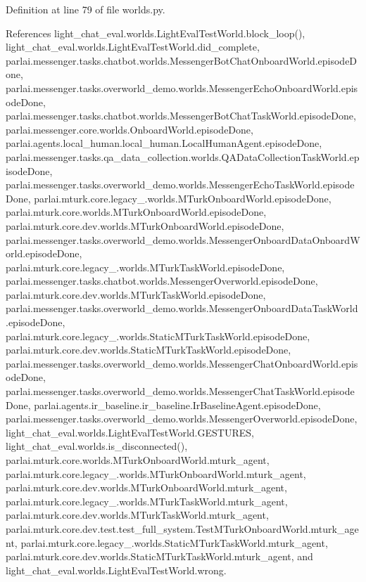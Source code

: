 Definition at line 79 of file worlds.\+py.



References light\+\_\+chat\+\_\+eval.\+worlds.\+Light\+Eval\+Test\+World.\+block\+\_\+loop(), light\+\_\+chat\+\_\+eval.\+worlds.\+Light\+Eval\+Test\+World.\+did\+\_\+complete, parlai.\+messenger.\+tasks.\+chatbot.\+worlds.\+Messenger\+Bot\+Chat\+Onboard\+World.\+episode\+Done, parlai.\+messenger.\+tasks.\+overworld\+\_\+demo.\+worlds.\+Messenger\+Echo\+Onboard\+World.\+episode\+Done, parlai.\+messenger.\+tasks.\+chatbot.\+worlds.\+Messenger\+Bot\+Chat\+Task\+World.\+episode\+Done, parlai.\+messenger.\+core.\+worlds.\+Onboard\+World.\+episode\+Done, parlai.\+agents.\+local\+\_\+human.\+local\+\_\+human.\+Local\+Human\+Agent.\+episode\+Done, parlai.\+messenger.\+tasks.\+qa\+\_\+data\+\_\+collection.\+worlds.\+Q\+A\+Data\+Collection\+Task\+World.\+episode\+Done, parlai.\+messenger.\+tasks.\+overworld\+\_\+demo.\+worlds.\+Messenger\+Echo\+Task\+World.\+episode\+Done, parlai.\+mturk.\+core.\+legacy\+\_.\+worlds.\+M\+Turk\+Onboard\+World.\+episode\+Done, parlai.\+mturk.\+core.\+worlds.\+M\+Turk\+Onboard\+World.\+episode\+Done, parlai.\+mturk.\+core.\+dev.\+worlds.\+M\+Turk\+Onboard\+World.\+episode\+Done, parlai.\+messenger.\+tasks.\+overworld\+\_\+demo.\+worlds.\+Messenger\+Onboard\+Data\+Onboard\+World.\+episode\+Done, parlai.\+mturk.\+core.\+legacy\+\_.\+worlds.\+M\+Turk\+Task\+World.\+episode\+Done, parlai.\+messenger.\+tasks.\+chatbot.\+worlds.\+Messenger\+Overworld.\+episode\+Done, parlai.\+mturk.\+core.\+dev.\+worlds.\+M\+Turk\+Task\+World.\+episode\+Done, parlai.\+messenger.\+tasks.\+overworld\+\_\+demo.\+worlds.\+Messenger\+Onboard\+Data\+Task\+World.\+episode\+Done, parlai.\+mturk.\+core.\+legacy\+\_.\+worlds.\+Static\+M\+Turk\+Task\+World.\+episode\+Done, parlai.\+mturk.\+core.\+dev.\+worlds.\+Static\+M\+Turk\+Task\+World.\+episode\+Done, parlai.\+messenger.\+tasks.\+overworld\+\_\+demo.\+worlds.\+Messenger\+Chat\+Onboard\+World.\+episode\+Done, parlai.\+messenger.\+tasks.\+overworld\+\_\+demo.\+worlds.\+Messenger\+Chat\+Task\+World.\+episode\+Done, parlai.\+agents.\+ir\+\_\+baseline.\+ir\+\_\+baseline.\+Ir\+Baseline\+Agent.\+episode\+Done, parlai.\+messenger.\+tasks.\+overworld\+\_\+demo.\+worlds.\+Messenger\+Overworld.\+episode\+Done, light\+\_\+chat\+\_\+eval.\+worlds.\+Light\+Eval\+Test\+World.\+G\+E\+S\+T\+U\+R\+ES, light\+\_\+chat\+\_\+eval.\+worlds.\+is\+\_\+disconnected(), parlai.\+mturk.\+core.\+worlds.\+M\+Turk\+Onboard\+World.\+mturk\+\_\+agent, parlai.\+mturk.\+core.\+legacy\+\_.\+worlds.\+M\+Turk\+Onboard\+World.\+mturk\+\_\+agent, parlai.\+mturk.\+core.\+dev.\+worlds.\+M\+Turk\+Onboard\+World.\+mturk\+\_\+agent, parlai.\+mturk.\+core.\+legacy\+\_.\+worlds.\+M\+Turk\+Task\+World.\+mturk\+\_\+agent, parlai.\+mturk.\+core.\+dev.\+worlds.\+M\+Turk\+Task\+World.\+mturk\+\_\+agent, parlai.\+mturk.\+core.\+dev.\+test.\+test\+\_\+full\+\_\+system.\+Test\+M\+Turk\+Onboard\+World.\+mturk\+\_\+agent, parlai.\+mturk.\+core.\+legacy\+\_.\+worlds.\+Static\+M\+Turk\+Task\+World.\+mturk\+\_\+agent, parlai.\+mturk.\+core.\+dev.\+worlds.\+Static\+M\+Turk\+Task\+World.\+mturk\+\_\+agent, and light\+\_\+chat\+\_\+eval.\+worlds.\+Light\+Eval\+Test\+World.\+wrong.

